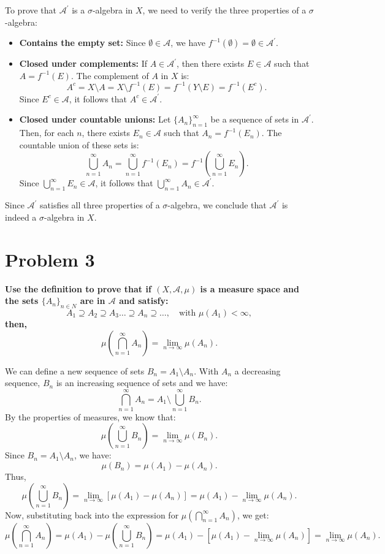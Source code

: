 \documentclass[11pt]{article}
\begin{document}
To prove that \(\mathcal{A}^{\prime}\) is a \(\sigma\)-algebra in \(X\), we need to verify the three properties of a \(\sigma\)-algebra:
\begin{itemize}
    \item \textbf{Contains the empty set:} Since \(\emptyset \in \mathcal{A}\), we have \(f^{-1}(\emptyset) = \emptyset \in \mathcal{A}^{\prime}\).
    \item \textbf{Closed under complements:} If \(A \in \mathcal{A}^{\prime}\), then there exists \(E \in \mathcal{A}\) such that \(A = f^{-1}(E)\). The complement of \(A\) in \(X\) is:
    \[A^c = X \setminus A = X \setminus f^{-1}(E) = f^{-1}(Y \setminus E) = f^{-1}(E^c).\]
    Since \(E^c \in \mathcal{A}\), it follows that \(A^c \in \mathcal{A}^{\prime}\).
    \item \textbf{Closed under countable unions:} Let \(\{A_n\}_{n=1}^{\infty}\) be a sequence of sets in \(\mathcal{A}^{\prime}\). Then, for each \(n\), there exists \(E_n \in \mathcal{A}\) such that \(A_n = f^{-1}(E_n)\). The countable union of these sets is:
    \[\bigcup_{n=1}^{\infty} A_n = \bigcup_{n=1}^{\infty} f^{-1}(E_n) = f^{-1}\left(\bigcup_{n=1}^{\infty} E_n\right).\]
    Since \(\bigcup_{n=1}^{\infty} E_n \in \mathcal{A}\), it follows that \(\bigcup_{n=1}^{\infty} A_n \in \mathcal{A}^{\prime}\).
\end{itemize}
Since \(\mathcal{A}^{\prime}\) satisfies all three properties of a \(\sigma\)-algebra, we conclude that \(\mathcal{A}^{\prime}\) is indeed a \(\sigma\)-algebra in \(X\).

\section*{Problem 3}
\textbf{\large Use the definition to prove that if \((X, \mathcal{A}, \mu)\) is a measure space and the sets \(\{A_n\}_{n \in N}\) are in \(\mathcal{A}\) and satisfy:
\[A_1 \supseteq A_2 \supseteq A_3 \dots \supseteq A_n \supseteq \dots, \quad \text{with } \mu(A_1) < \infty,\]
then,
\[\mu (\bigcap_{n=1}^{\infty} A_n) = \lim_{n \to \infty} \mu(A_n).\]}

We can define a new sequence of sets \(B_n = A_1 \setminus A_n\). With \(A_n\) a decreasing sequence, \(B_n\) is an increasing sequence of sets and we have:
\[\bigcap_{n=1}^{\infty} A_n = A_1 \setminus \bigcup_{n=1}^{\infty} B_n.\]
By the properties of measures, we know that:
\[\mu\left(\bigcup_{n=1}^{\infty} B_n\right) = \lim_{n \to \infty} \mu(B_n).\]
Since \(B_n = A_1 \setminus A_n\), we have:
\[\mu(B_n) = \mu(A_1) - \mu(A_n).\]
Thus,
\[\mu\left(\bigcup_{n=1}^{\infty} B_n\right) = \lim_{n \to \infty} [\mu(A_1) - \mu(A_n)] = \mu(A_1) - \lim_{n \to \infty} \mu(A_n).\]
Now, substituting back into the expression for \(\mu\left(\bigcap_{n=1}^{\infty} A_n\right)\), we get:
\[\mu\left(\bigcap_{n=1}^{\infty} A_n\right) = \mu(A_1) - \mu\left(\bigcup_{n=1}^{\infty} B_n\right) = \mu(A_1) - [\mu(A_1) - \lim_{n \to \infty} \mu(A_n)] = \lim_{n \to \infty} \mu(A_n).\]
\end{document}
